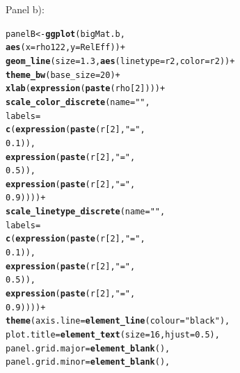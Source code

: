 \documentclass{article}\usepackage[]{graphicx}\usepackage[]{color}
\makeatletter
\newcommand{\hlnum}[1]{\textcolor[rgb]{0.686,0.059,0.569}{#1}}%
\newcommand{\hlstr}[1]{\textcolor[rgb]{0.192,0.494,0.8}{#1}}%
\newcommand{\hlopt}[1]{\textcolor[rgb]{0,0,0}{#1}}%
\newcommand{\hlstd}[1]{\textcolor[rgb]{0.345,0.345,0.345}{#1}}%
\newcommand{\hlkwb}[1]{\textcolor[rgb]{0.69,0.353,0.396}{#1}}%
\newcommand{\hlkwc}[1]{\textcolor[rgb]{0.333,0.667,0.333}{#1}}%
\newcommand{\hlkwd}[1]{\textcolor[rgb]{0.737,0.353,0.396}{\textbf{#1}}}%
\newenvironment{kframe}{%
 \def\at@end@of@kframe{}%
 \ifinner\ifhmode%
  \def\at@end@of@kframe{\end{minipage}}%
  \begin{minipage}{\columnwidth}%
 \fi\fi%
 \def\FrameCommand##1{\hskip\@totalleftmargin \hskip-\fboxsep
 \colorbox{shadecolor}{##1}\hskip-\fboxsep
     \hskip-\linewidth \hskip-\@totalleftmargin \hskip\columnwidth}%
 \MakeFramed {\advance\hsize-\width
   \@totalleftmargin\z@ \linewidth\hsize
   \@setminipage}}%
 {\par\unskip\endMakeFramed%
 \at@end@of@kframe}
\newenvironment{knitrout}{}{} %
\makeatother
\begin{document}
Panel b):
\begin{knitrout}
\color{fgcolor}\begin{kframe}
\begin{alltt}
\hlstd{panelB} \hlkwb{<-} \hlkwd{ggplot}\hlstd{(bigMat.b,}
                 \hlkwd{aes}\hlstd{(}\hlkwc{x}\hlstd{=rho122,} \hlkwc{y}\hlstd{=RelEff))} \hlopt{+}
  \hlkwd{geom_line}\hlstd{(}\hlkwc{size}\hlstd{=}\hlnum{1.3}\hlstd{,} \hlkwd{aes}\hlstd{(}\hlkwc{linetype}\hlstd{=r2,} \hlkwc{color}\hlstd{=r2))} \hlopt{+}
  \hlkwd{theme_bw}\hlstd{(}\hlkwc{base_size} \hlstd{=} \hlnum{20}\hlstd{)} \hlopt{+}
  \hlkwd{xlab}\hlstd{(}\hlkwd{expression}\hlstd{(}\hlkwd{paste}\hlstd{(rho[}\hlnum{2}\hlstd{])))} \hlopt{+}
  \hlkwd{scale_color_discrete}\hlstd{(}\hlkwc{name} \hlstd{=} \hlstr{""}\hlstd{,}
                       \hlkwc{labels} \hlstd{=}
                         \hlkwd{c}\hlstd{(}\hlkwd{expression}\hlstd{(}\hlkwd{paste}\hlstd{(r[}\hlnum{2}\hlstd{],} \hlstr{"="}\hlstd{,}
                                            \hlnum{0.1}\hlstd{)),}
                           \hlkwd{expression}\hlstd{(}\hlkwd{paste}\hlstd{(r[}\hlnum{2}\hlstd{],} \hlstr{"="}\hlstd{,}
                                            \hlnum{0.5}\hlstd{)),}
                           \hlkwd{expression}\hlstd{(}\hlkwd{paste}\hlstd{(r[}\hlnum{2}\hlstd{],} \hlstr{"="}\hlstd{,}
                                            \hlnum{0.9}\hlstd{))))} \hlopt{+}
  \hlkwd{scale_linetype_discrete}\hlstd{(}\hlkwc{name} \hlstd{=} \hlstr{""}\hlstd{,}
                          \hlkwc{labels} \hlstd{=}
                            \hlkwd{c}\hlstd{(}\hlkwd{expression}\hlstd{(}\hlkwd{paste}\hlstd{(r[}\hlnum{2}\hlstd{],} \hlstr{"="}\hlstd{,}
                                               \hlnum{0.1}\hlstd{)),}
                              \hlkwd{expression}\hlstd{(}\hlkwd{paste}\hlstd{(r[}\hlnum{2}\hlstd{],} \hlstr{"="}\hlstd{,}
                                               \hlnum{0.5}\hlstd{)),}
                              \hlkwd{expression}\hlstd{(}\hlkwd{paste}\hlstd{(r[}\hlnum{2}\hlstd{],} \hlstr{"="}\hlstd{,}
                                               \hlnum{0.9}\hlstd{))))} \hlopt{+}
  \hlkwd{theme}\hlstd{(}\hlkwc{axis.line} \hlstd{=} \hlkwd{element_line}\hlstd{(}\hlkwc{colour} \hlstd{=} \hlstr{"black"}\hlstd{),}
        \hlkwc{plot.title} \hlstd{=} \hlkwd{element_text}\hlstd{(}\hlkwc{size} \hlstd{=} \hlnum{16}\hlstd{,} \hlkwc{hjust} \hlstd{=} \hlnum{0.5}\hlstd{),}
        \hlkwc{panel.grid.major} \hlstd{=} \hlkwd{element_blank}\hlstd{(),}
        \hlkwc{panel.grid.minor} \hlstd{=} \hlkwd{element_blank}\hlstd{(),}

\end{alltt}
\end{kframe}
\end{knitrout}
\end{document}
